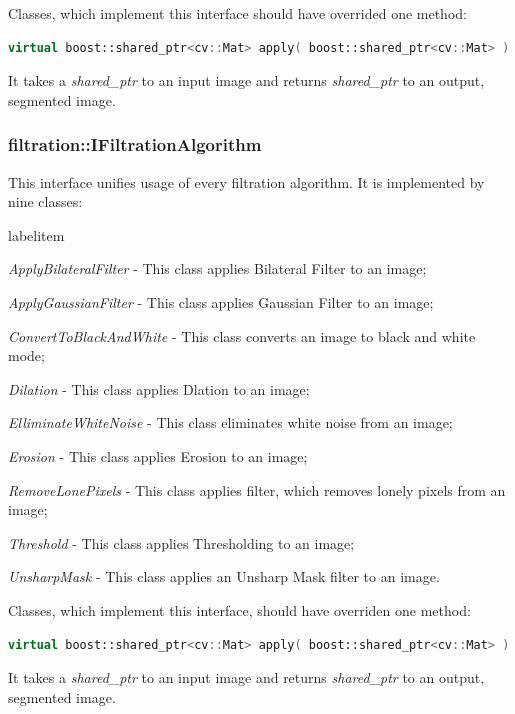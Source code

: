 \documentclass[a4paper,onecolumn,oneside,12pt]{memoir}
\makeatletter
\renewenvironment{itemize}{
  \begin{list}{  
  \csname labelitem\romannumeral\the\@listdepth\endcsname}{
  \setlength{\leftmargin}{1em}
	\setlength{\topsep}{6pt}%
	\setlength{\partopsep}{0pt}%
	\setlength{\parskip}{0pt}%
	\setlength{\parsep}{0pt}%
	\setlength{\itemsep}{0pt}}
}{
  \end{list}
}
\makeatother
\begin{document}
Classes, which implement this interface should have overrided one method:

\begin{lstlisting}[language=C++, caption=ISegmentationAlgorithm methods]
virtual boost::shared_ptr<cv::Mat> apply( boost::shared_ptr<cv::Mat> ) const = 0;
\end{lstlisting}

It takes a \textit{shared\_ptr} to an input image and returns
\textit{shared\_ptr} to an output, segmented image.

\subsubsection{filtration::IFiltrationAlgorithm}

This interface unifies usage of every filtration algorithm. It is implemented by nine classes:
\begin{itemize}
  \item \textit{ApplyBilateralFilter} - This class applies Bilateral Filter to an image;
  \item \textit{ApplyGaussianFilter} - This class applies Gaussian Filter to an image;
  \item \textit{ConvertToBlackAndWhite} - This class converts an image to black and white mode;
  \item \textit{Dilation} - This class applies Dlation to an image;
  \item \textit{ElliminateWhiteNoise} - This class eliminates white noise from an image;
  \item \textit{Erosion} - This class applies Erosion to an image;
  \item \textit{RemoveLonePixels} - This class applies filter, which removes lonely pixels from an
        image;
  \item \textit{Threshold} - This class applies Thresholding to an image;
  \item \textit{UnsharpMask} - This class applies an Unsharp Mask filter to an image.
\end{itemize}

Classes, which implement this interface, should have overriden one method:

\begin{lstlisting}[language=C++, caption=IFiltrationAlgorithm methods]
virtual boost::shared_ptr<cv::Mat> apply( boost::shared_ptr<cv::Mat> ) const = 0;
\end{lstlisting}

It takes a \textit{shared\_ptr} to an input image and returns
\textit{shared\_ptr} to an output, segmented image.
\end{document}
